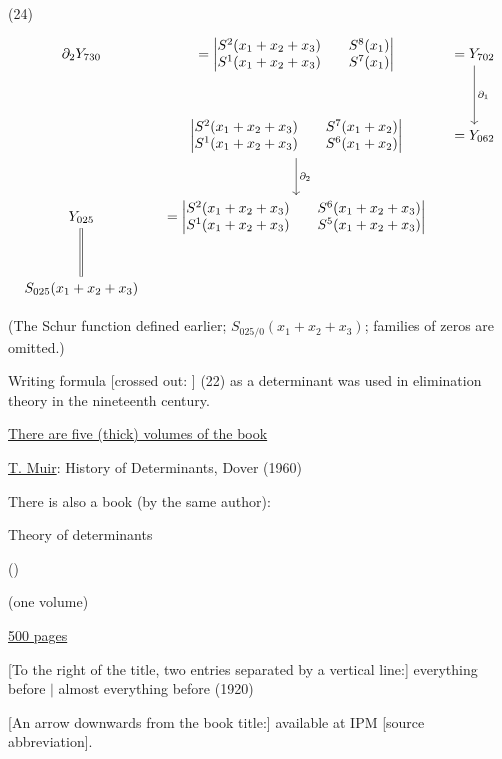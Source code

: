 (24)
\begin{equation*}
\begin{tikzcd}[column sep=small,row sep=large]
{\partial_2Y_{730}}
& {=\begin{vmatrix}S^2(x_1+x_2+x_3)&S^8(x_1)\\S^1(x_1+x_2+x_3)&S^7(x_1)\end{vmatrix}}
& {=Y_{702}}\arrow[d,"\partial_1"]\\
& {\begin{vmatrix}S^2(x_1+x_2+x_3)&S^7(x_1+x_2)\\S^1(x_1+x_2+x_3)&S^6(x_1+x_2)\end{vmatrix}}\arrow[d,"\partial_2"]
& {=Y_{062}}\\
{Y_{025}}\arrow[d,equal]
& {=\begin{vmatrix}S^2(x_1+x_2+x_3)&S^6(x_1+x_2+x_3)\\S^1(x_1+x_2+x_3)&S^5(x_1+x_2+x_3)\end{vmatrix}}
&\\
{S_{025}(x_1+x_2+x_3)}&&
\end{tikzcd}
\end{equation*}

(The Schur function defined earlier; $S_{025/0}(x_1+x_2+x_3)$;
families of zeros are omitted.)

Writing formula
[crossed out: ]
(22) as a determinant was used
in elimination theory in the nineteenth century.

\underline{There are five (thick) volumes of the book}

\underline{T. Muir}: History of Determinants, Dover (1960)



There is also a book (by the same author):

Theory of determinants

()

(one volume)

\underline{500 pages}

[To the right of the title, two entries separated by a vertical line:]
everything before  $\vert$ almost everything before (1920)

[An arrow downwards from the book title:] available at IPM [source abbreviation].

